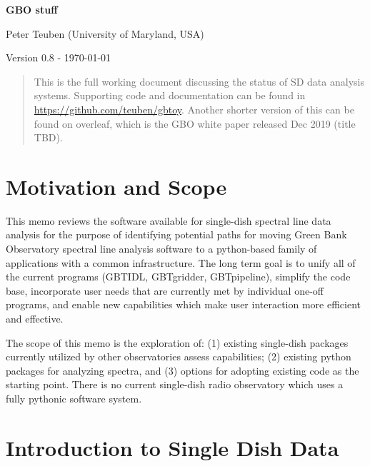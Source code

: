 \documentclass[12pt,a4paper]{article}
\begin{document}
\pagestyle{plain}
 

\begin{center}
{\Large{\bf{  GBO stuff  \\  }}} 

\end{center}
\bigskip

\centerline{Peter Teuben (University of Maryland, USA)}

\centerline{Version 0.8 - \today}
\bigskip

\begin{abstract}

This is the full working document discussing the status of SD data analysis
systems.  Supporting code and documentation can be found in
\url{https://github.com/teuben/gbtoy}.  Another shorter version of this
can be found on overleaf, which is the GBO white paper released Dec 2019
(title TBD).

\end{abstract}

\tableofcontents

\section{Motivation and Scope}

This memo reviews the software available for single-dish spectral line data analysis for the purpose of identifying potential paths for moving Green Bank Observatory spectral line analysis software to a python-based family of applications with a common infrastructure. The long term goal is to unify all of the current programs (GBTIDL, GBTgridder, GBTpipeline), simplify the code base, incorporate user needs that are currently met by individual one-off programs, and enable new capabilities which make user interaction more efficient and effective.

The scope of this memo is the exploration of: (1) existing single-dish packages currently utilized by other observatories assess capabilities; (2) existing python packages for analyzing spectra, and (3) options for adopting existing code as the starting point. There is no current single-dish radio observatory which uses a fully pythonic software system.

\section{Introduction to Single Dish Data}
\end{document}

